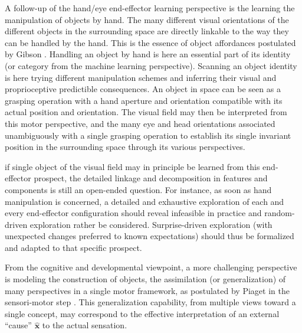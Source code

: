 \documentclass[11pt]{article}
\begin{document}
A follow-up of the hand/eye end-effector learning perspective is the learning the manipulation of objects by hand. The many different visual orientations of the different objects in the surrounding space are directly linkable to the way they can be handled by the hand. This is the essence of object affordances postulated by Gibson \cite{Gib79}. Handling an object by hand is here an essential part of its identity (or category from the machine learning perspective). Scanning an object identity is here trying different manipulation schemes and inferring their visual and proprioceptive predictible consequences. An object in space can be seen as a grasping operation with a hand aperture and orientation compatible with its actual position and orientation. The visual field may then be interpreted from this motor perspective, and the many eye and head orientations associated unambiguously with a single grasping operation to establish its single invariant position in the surrounding space through its various perspectives. 

if single object of the visual field may in principle be learned from this end-effector prospect, the detailed linkage and decomposition in features and components is still an open-ended question. For instance, as soon as hand manipulation is concerned, a detailed and exhaustive exploration of each and every end-effector configuration should reveal infeasible in practice and random-driven exploration rather be considered. Surprise-driven exploration (with unexpected changes preferred to known expectations) should thus be formalized and adapted to that specific prospect.

From the cognitive and developmental viewpoint, a more challenging perspective is modeling the construction of objects, the assimilation (or generalization) of many perspectives in a single motor framework, as postulated by Piaget in the sensori-motor step \cite{Piaget1973}. This generalization capability, from multiple views toward a single concept, may correspond to the effective interpretation of an external ``cause'' $\hat{\boldsymbol{x}}$ to the actual sensation.  




\end{document}
